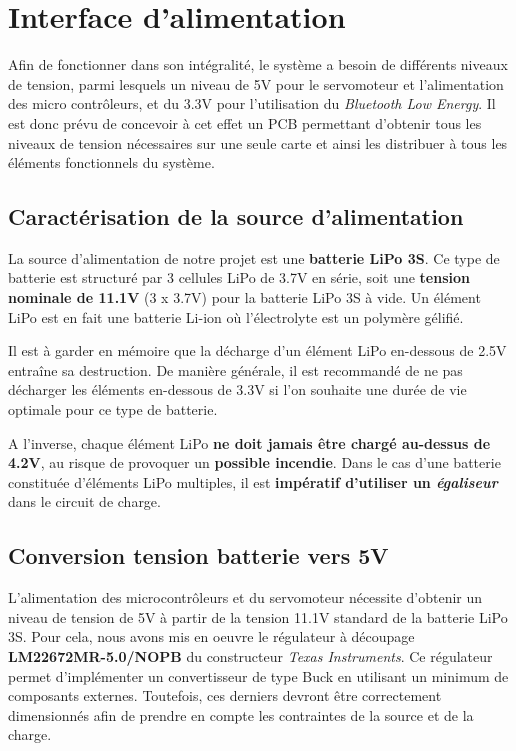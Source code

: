 \documentclass[a4paper,12pt]{book}
\begin{document}
	

	\chapter{Interface d'alimentation}
		
	Afin de fonctionner dans son intégralité, le système a besoin de différents niveaux de tension, parmi lesquels un niveau de 5V pour le servomoteur et l'alimentation des micro contrôleurs, et du 3.3V pour l'utilisation du \textit{Bluetooth Low Energy}. Il est donc prévu de concevoir à cet effet un PCB permettant d'obtenir tous les niveaux de tension nécessaires sur une seule carte et ainsi les distribuer à tous les éléments fonctionnels du système.
		
		\section{Caractérisation de la source d'alimentation}
			
		La source d'alimentation de notre projet est une \textbf{batterie LiPo 3S}. Ce type de batterie est structuré par 3 cellules LiPo de 3.7V en série, soit une \textbf{tension nominale de 11.1V} (3 x 3.7V) pour la batterie LiPo 3S à vide. Un élément LiPo est en fait une batterie Li-ion où l'électrolyte est un polymère gélifié.
			
		Il est à garder en mémoire que la décharge d'un élément LiPo en-dessous de 2.5V entraîne sa destruction. De manière générale, il est recommandé de ne pas décharger les éléments en-dessous de 3.3V si l'on souhaite une durée de vie optimale pour ce type de batterie. 
			
		A l'inverse, chaque élément LiPo \textbf{ne doit jamais être chargé au-dessus de 4.2V}, au risque de provoquer un \textbf{possible incendie}. Dans le cas d'une batterie constituée d'éléments LiPo multiples, il est \textbf{impératif d'utiliser un \textit{égaliseur}} dans le circuit de charge.
		
			
		\section{Conversion tension batterie vers 5V}
			
			L'alimentation des microcontrôleurs et du servomoteur nécessite d'obtenir un niveau de tension de 5V à partir de la tension 11.1V standard de la batterie LiPo 3S. Pour cela, nous avons mis en oeuvre le régulateur à découpage \textbf{LM22672MR-5.0/NOPB} du constructeur \textit{Texas Instruments}. Ce régulateur permet d'implémenter un convertisseur de type Buck en utilisant un minimum de composants externes. Toutefois, ces derniers devront être correctement dimensionnés afin de prendre en compte les contraintes de la source et de la charge.
			
\end{document}

